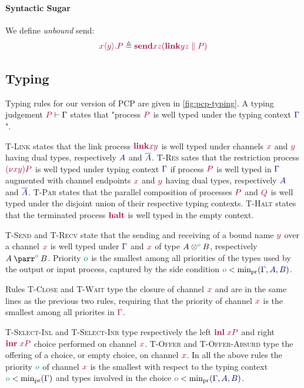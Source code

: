 \documentclass[main.tex]{subfiles}
\begin{document}
\paragraph*{Syntactic Sugar}
We define \emph{unbound} send:
\[
  \tm{\usend{x}{y}{P}}\elabarrow\tm{\send{x}{z}{(\ppar{\link{y}{z}}{P})}}
\]

\subsection{Typing}
Typing rules for our version of PCP are given in \cref{fig:pcp-typing}. A typing judgement $\seq{P}{\Gamma}$ states that "process $\tm P$ is well typed under the typing context $\ty \Gamma$".

\textsc{T-Link} states that the link process $\tm{\link{x}{y}}$ is well typed under channels $\tm x$ and $\tm y$ having dual types, respectively $\ty A$ and $\ty {\co A}$. \textsc{T-Res} sates that the restriction process $\tm{\res{x}{y}{P}}$ is well typed under typing context $\ty\Gamma$ if process $\tm P$ is well typed in $\ty\Gamma$ augmented with channel endpoints $\tm x$ and $\tm y$ having dual types, respectively $\ty A$ and $\ty {\co A}$. \textsc{T-Par} states that the parallel composition of processes $\tm P$ and $\tm Q$ is well typed under the disjoint union of their respective typing contexts. \textsc{T-Halt} states that the terminated process $\tm{\halt}$ is well typed in the empty context.

\textsc{T-Send} and \textsc{T-Recv} state that the sending and receiving of a bound name $\tm y$ over a channel $\tm x$ is well typed under $\ty\Gamma$ and $\tm x$ of type $\tytens[\cs{o}]{A}{B}$, respectively ${\typarr[\cs{o}]{A}{B}}$. Priority $\cs o$ is the smallest among all priorities of the types used by the output or input process, captured by the side condition $\cs{o}<\minpr(\ty{\Gamma},\ty{A},\ty{B})$.

Rules \textsc{T-Close} and \textsc{T-Wait} type the closure of channel $\tm x$ and are in the same lines as the previous two rules, requiring that the priority of channel $\tm x$ is the smallest among all priorites in $\tm\Gamma$.

\textsc{T-Select-Inl} and \textsc{T-Select-Inr} type respectively the left $\tm{\inl{x}{P}}$ and right $\tm{\inr{x}{P}}$ choice performed on channel $\tm x$. \textsc{T-Offer} and \textsc{T-Offer-Absurd} type the offering of a choice, or empty choice, on channel $\tm x$. In all the above rules the priority $\cs o$ of channel $\tm x$ is the smallest with respect to the typing context $\cs{o}<\minpr(\ty{\Gamma})$ and types involved in the choice $\cs{o}<\minpr(\ty{\Gamma},\ty{A},\ty{B})$.
 
\end{document}
